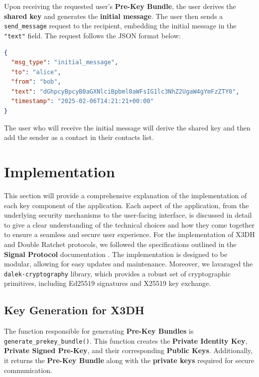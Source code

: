 
Upon receiving the requested user's \textbf{Pre-Key Bundle}, the user derives the \textbf{shared key} and generates the \textbf{initial message}. The user then sends a \texttt{send\_message} request to the recipient, embedding the initial message in the \texttt{"text"} field. The request follows the JSON format below:

\begin{lstlisting}[language=json, caption={Initial Message Request Format}]
{
  "msg_type": "initial_message",
  "to": "alice",
  "from": "bob",
  "text": "dGhpcyBpcyB0aGXNlciBpbml0aWFsIG1lc3NhZ2UgaW4gYmFzZTY0",
  "timestamp": "2025-02-06T14:21:21+00:00"
}
\end{lstlisting}

The user who will receive the initial message will derive the shared key and then add the sender as a contact in their contacts list.

\section{Implementation}
\label{sec:Implementation}

This section will provide a comprehensive explanation of the implementation of each key component of the application. Each aspect of the application, from the underlying security mechanisms to the user-facing interface, is discussed in detail to give a clear understanding of the technical choices and how they come together to ensure a seamless and secure user experience.
For the implementation of X3DH and Double Ratchet protocols, we followed the specifications outlined in the \textbf{Signal Protocol} documentation \cite{x3dh} \cite{DoubleRachet}. The implementation is designed to be modular, allowing for easy updates and maintenance. Moreover, we lavaraged the \texttt{dalek-cryptography} library, which provides a robust set of cryptographic primitives, including Ed25519 signatures and X25519 key exchange.

\subsection{Key Generation for X3DH}
\label{subsec:KeyGeneration}

The function responsible for generating \textbf{Pre-Key Bundles} is \texttt{generate\_prekey\_bundle()}. This function creates the \textbf{Private Identity Key}, \textbf{Private Signed Pre-Key}, and their corresponding \textbf{Public Keys}. Additionally, it returns the \textbf{Pre-Key Bundle} along with the \textbf{private keys} required for secure communication.

